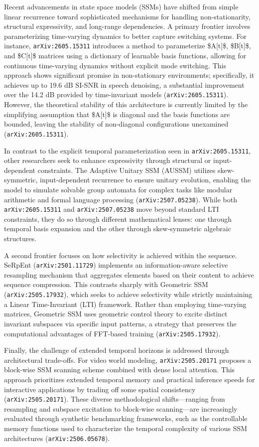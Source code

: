 \documentclass[11pt]{article}
\begin{document}
Recent advancements in state space models (SSMs) have shifted from simple linear recurrence toward sophisticated mechanisms for handling non-stationarity, structural expressivity, and long-range dependencies. A primary frontier involves parameterizing time-varying dynamics to better capture switching systems. For instance, \texttt{arXiv:2605.15311} introduces a method to parameterize \$A[t]\$, \$B[t]\$, and \$C[t]\$ matrices using a dictionary of learnable basis functions, allowing for continuous time-varying dynamics without explicit mode switching. This approach shows significant promise in non-stationary environments; specifically, it achieves up to 19.6 dB SI-SNR in speech denoising, a substantial improvement over the 14.2 dB provided by time-invariant models (\texttt{arXiv:2605.15311}). However, the theoretical stability of this architecture is currently limited by the simplifying assumption that \$A[t]\$ is diagonal and the basis functions are bounded, leaving the stability of non-diagonal configurations unexamined (\texttt{arXiv:2605.15311}).

In contrast to the explicit temporal parameterization seen in \texttt{arXiv:2605.15311}, other researchers seek to enhance expressivity through structural or input-dependent constraints. The Adaptive Unitary SSM (AUSSM) utilizes skew-symmetric, input-dependent recurrence to ensure unitary evolution, enabling the model to simulate solvable group automata for complex tasks like modular arithmetic and formal language processing (\texttt{arXiv:2507.05238}). While both \texttt{arXiv:2605.15311} and \texttt{arXiv:2507.05238} move beyond standard LTI constraints, they do so through different mathematical lenses: one through temporal basis expansion and the other through skew-symmetric algebraic structures.

A second frontier focuses on how selectivity is achieved within the sequence. SeRpEnt (\texttt{arXiv:2501.11729}) implements an information-aware selective resampling mechanism that aggregates elements based on their content to achieve sequence compression. This contrasts sharply with Geometric SSM (\texttt{arXiv:2505.17932}), which seeks to achieve selectivity while strictly maintaining a Linear Time-Invariant (LTI) framework. Rather than employing time-varying matrices, Geometric SSM uses geometric control theory to excite distinct invariant subspaces via specific input patterns, a strategy that preserves the computational advantages of FFT-based training (\texttt{arXiv:2505.17932}).

Finally, the challenge of extended temporal horizons is addressed through architectural trade-offs. For video world modeling, \texttt{arXiv:2505.20171} proposes a block-wise SSM scanning scheme combined with dense local attention. This approach prioritizes extended temporal memory and practical inference speeds for interactive applications by trading off some spatial consistency (\texttt{arXiv:2505.20171}). These diverse methodological shifts—ranging from resampling and subspace excitation to block-wise scanning—are increasingly evaluated through synthetic benchmarking frameworks, such as the controllable memory functions used to characterize the temporal complexity of various SSM architectures (\texttt{arXiv:2506.05678}).
\end{document}
